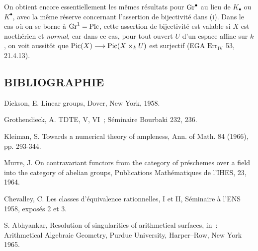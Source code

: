 
On
obtient encore essentiellement les mêmes résultats pour \(\Gr^\bullet\) au lieu de \(K_\bullet\) ou \(K^\bullet\), avec la même réserve concernant l'assertion de bijectivité dans (i). Dans le cas où on se borne à \(\Gr^1=\Pic\), cette assertion de bijectivité est valable si \(X\) est noethérien et \emph{normal}, car dans ce cas, pour tout ouvert \(U\) d'un espace affine sur \(k\), on voit aussitôt que \(\Pic(X)\longrightarrow \Pic(X\times_k U)\) est surjectif (EGA \(\mathrm{Err}_{\mathrm{IV}}\) 53, 21.4.13).

\subsection*{BIBLIOGRAPHIE}
\begin{enumerate}[label={[\arabic*]}]
\item Dickson, E. Linear groups, Dover, New York, 1958.
\item Grothendieck, A. TDTE, V, VI~; Séminaire Bourbaki 232, 236.
\item Kleiman, S. Towards a numerical theory of ampleness, Ann. of Math. 84 (1966), pp. 293-344.
\item Murre, J. On contravariant functors from the category of préschemes over a field into the category of abelian groups, Publications Mathématiques de l'IHES, 23, 1964.
\item Chevalley, C. Les classes d'équivalence rationnelles, I et II, Séminaire à l'ENS 1958, exposés 2 et 3.
\item S. Abhyankar, Resolution of singularities of arithmetical surfaces, in~: Arithmetical Algebraic Geometry, Purdue University, Harper--Row, New York 1965.
\end{enumerate}

\providecommand{\Isom}{\operatorname{Isom}}
\providecommand{\Hom}{\operatorname{Hom}}
\providecommand{\Coker}{\operatorname{Coker}}
\providecommand{\Nil}{\operatorname{Nil}}
\providecommand{\im}{\operatorname{Im}}
\providecommand{\coker}{\operatorname{coker}}
\providecommand{\Supp}{\operatorname{Supp}}
\providecommand{\fppf}{\mathrm{fppf}}
\providecommand{\zar}{\mathrm{zar}}
\providecommand{\GL}{\operatorname{Gl}}
\providecommand{\Gr}{\operatorname{Gr}}
\providecommand{\Pic}{\operatorname{Pic}}
\providecommand{\Spec}{\operatorname{Spec}}
\providecommand{\V}{\operatorname{V}}
\providecommand{\Ass}{\operatorname{Ass}}

\newpage
